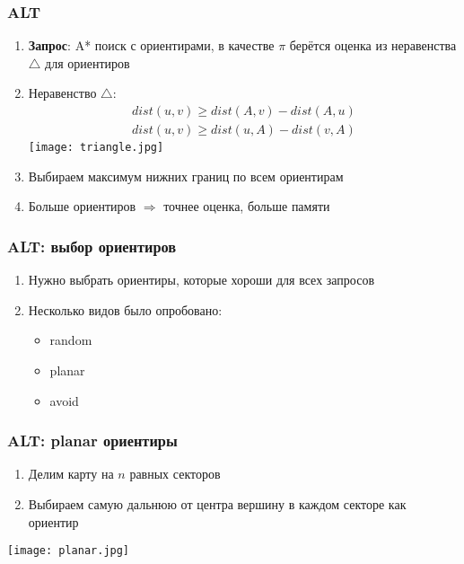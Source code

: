 \documentclass{beamer}
\begin{document}


\begin{frame}
\frametitle{ALT}
\begin{enumerate}	
\item \textbf{Запрос}: A* поиск с ориентирами, в качестве $\pi$ берётся оценка из неравенства $\triangle$ для ориентиров
\item Неравенство $\triangle \colon$
\begin{gather*}
	dist(u, v) \geq dist(A, v) - dist(A, u)\\
    dist(u, v) \geq dist(u, A) - dist(v, A)
\end{gather*}
\texttt{[image: triangle.jpg]}
\item Выбираем максимум нижних границ по всем ориентирам
\item Больше ориентиров $\Rightarrow$ точнее оценка, больше памяти
\end{enumerate}
\end{frame}


\begin{frame}
\frametitle{ALT: выбор ориентиров}
\begin{enumerate}	
\item Нужно выбрать ориентиры, которые хороши для всех запросов
\item Несколько видов было опробовано:
	\begin{itemize}
    \item random
    \item planar
    \item avoid
    \end{itemize}
\end{enumerate}
\end{frame}


\begin{frame}
\frametitle{ALT: planar ориентиры}
\begin{enumerate}	
\item Делим карту на $n$ равных секторов
\item Выбираем самую дальнюю от центра вершину в каждом секторе как ориентир
\end{enumerate}
\texttt{[image: planar.jpg]}
\end{frame}
\end{document}
